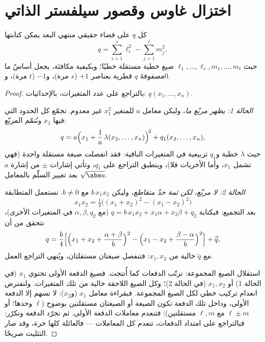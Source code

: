 \section{اختزال غاوس وقصور سيلفستر الذاتي}

\begin{theorem}\label{thm:b2:quadratic:gauss}
كل  $q$ على فضاء حقيقي منتهي البعد يمكن
كتابتها
\[
q = \sum_{i=1}^{s} \ell_i^2 - \sum_{j=1}^{t} m_j^2 ,
\]
حيث $\ell_1, \dots, \ell_s, m_1, \dots, m_t$ صيغ خطية مستقلة
خطيًا؛ وبكيفية مكافئة، يجعل أساسٌ ما مصفوفةَ
$q$ قطرية بعناصر $+1$ ($s$ مرة)، و$-1$ ($t$
مرة)، و$0$.
\end{theorem}

\begin{proof}
بالتراجع على عدد المتغيرات، بالإحداثيات: $q(x_1,
\dots, x_n)$.

\emph{الحالة 1: يظهر مربّع ما}، وليكن معامل $a$ للمتغير
$x_1^2$ غير معدوم. نجمّع كل الحدود التي فيها $x_1$ ونُتمّم
المربّع:
\[
q = a\Bigl(x_1 + \frac{1}{a}\,\lambda(x_2, \dots,
x_n)\Bigr)^{\!2} + q_1(x_2, \dots, x_n),
\]
حيث $\lambda$ خطية و$q_1$ تربيعية في المتغيرات
الباقية: فقد انفصلت صيغة مستقلة واحدة (فهي تشمل $x_1$، وأما
الأخريات فلا)، وينطبق التراجع على $q_1$، وتأتي إشارات $\pm$
من إشارة $a$ بعد تغيير السلّم بالمعامل $\sqrt{\abs a}$.

\emph{الحالة 2: لا مربّع، لكن ثمة حدّ متقاطع}، وليكن $b\,x_1x_2$ مع
$b \neq 0$. نستعمل المتطابقة
\[
x_1x_2 = \tfrac14\bigl((x_1 + x_2)^2 - (x_1 - x_2)^2\bigr)
\]
بعد التجميع: فبكتابة $q = b\,x_1x_2 + x_1\alpha + x_2\beta +
q_2$ (مع $\alpha, \beta, q_2$ في المتغيرات الأخرى)، نتحقق من أن
\[
q = \frac{b}{4}\Bigl[\Bigl(x_1 + x_2 + \frac{\alpha +
\beta}{b}\Bigr)^{2} - \Bigl(x_1 - x_2 + \frac{\beta -
\alpha}{b}\Bigr)^{2}\Bigr] + \widetilde q ,
\]
مع $\widetilde q$ خالية من $x_1, x_2$: فتنفصل صيغتان مستقلتان،
ويُنهي التراجع العمل.

استقلال الصيغ المجموعة: نرتّب الدفعات كما أُنتجت.
فصيغ الدفعة الأولى تحتوي $x_1$ (في الحالة 1)
أو $x_1, x_2$ (في الحالة 2)؛ وكل الصيغ اللاحقة خالية من تلك
المتغيرات. ولنفترض انعدام تركيب خطي لكل الصيغ
المجموعة. فبقراءة معامل $x_1$ (و$x_2$): لا تسهم إلا
الدفعة الأولى، وداخل تلك الدفعة تكون الصيغة أو الصيغتان
مستقلتين بوضوح ($\ell$ وحدها؛ أو $\ell \pm
m$ مع $\ell, m$ مستقلتين): فتنعدم معاملات الدفعة الأولى.
ثم نجرّد الدفعة ونكرّر: فبالتراجع على امتداد
الدفعات، تنعدم كل المعاملات --- فالعائلة كلها حرة،
وقد صار التثليث صريحًا.
\end{proof}

